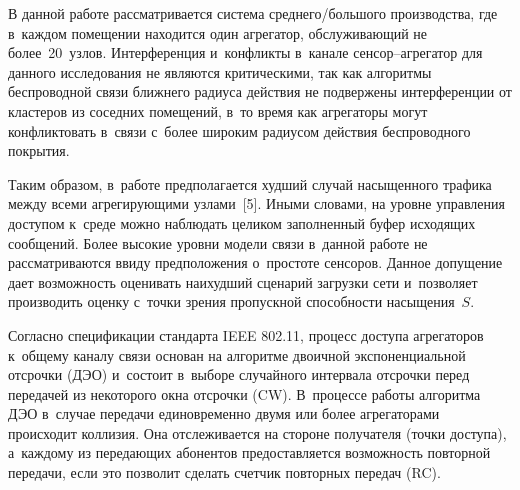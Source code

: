 \begin{multicols}{2}
     
    В данной работе рассматривается система среднего/большого 
производства, где в~каждом помещении находится один агрегатор, 
обслуживающий не более~20~узлов. Интерференция и~конфликты 
в~канале сен\-сор--аг\-ре\-га\-тор для данного исследования не являются 
критическими, так как алгоритмы беспроводной связи ближнего радиуса 
действия не подвержены интерференции от кластеров из соседних 
помещений, в~то время как агрегаторы могут конфликтовать в~связи 
с~более широким радиусом действия беспроводного покрытия. 

Таким 
образом, в~работе предполагается худший случай насыщенного трафика 
между всеми агрегирующими узлами~[5]. Иными словами, на уровне 
управления доступом к~среде можно наблюдать целиком заполненный 
буфер исходящих сообщений. Более высокие уровни модели связи 
в~данной работе не рассматриваются ввиду предположения о~прос\-то\-те 
сенсоров. Данное допущение дает возможность оценивать наихудший 
сценарий загрузки сети и~поз\-во\-ля\-ет производить оценку с~точки зрения 
пропускной способности насыщения~$S$.
    
    Согласно спецификации стандарта IEEE 802.11, процесс доступа 
агрегаторов к~общему каналу связи основан на алгоритме двоичной 
экспоненциальной отсрочки (ДЭО) и~состоит в~выборе случайного 
интервала отсрочки перед передачей из некоторого окна отсрочки 
(CW). В~процессе работы алгоритма ДЭО в~случае передачи 
единовременно двумя или более агрегаторами происходит коллизия. Она 
отслеживается на стороне получателя (точки доступа), а~каждому из 
передающих абонентов пред\-остав\-ля\-ет\-ся возможность повторной 
передачи, если это позволит сделать счетчик повторных передач (RC).


\pagebreak


\noindent
{\small
\begin{center}


\end{center}}
\end{multicols}
